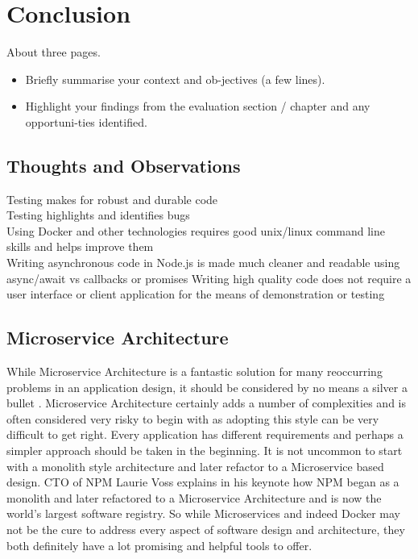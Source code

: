 \chapter{Conclusion}
About three pages.

\begin{itemize}
\item Briefly summarise your context and ob-jectives (a few lines).
\item Highlight your findings from the evaluation section / chapter and any opportuni-ties identified.
\end{itemize}

\section{Thoughts and Observations}
Testing makes for robust and durable code \\
Testing highlights and identifies bugs \\
Using Docker and other technologies requires good unix/linux command line skills and helps improve them \\
Writing asynchronous code in Node.js is made much cleaner and readable using async/await vs callbacks or promises
Writing high quality code does not require a user interface or client application for the means of demonstration or testing


\section{Microservice Architecture}
While Microservice Architecture is a fantastic solution for many reoccurring problems in an application design, it should be considered by no means a silver a bullet \cite{BuildingMicroServices}. Microservice Architecture certainly adds a number of complexities and is often considered very risky to begin with as adopting this style can be very difficult to get right. Every application has different requirements and perhaps a simpler approach should be taken in the beginning. It is not uncommon to start with a monolith style architecture and later refactor to a Microservice based design. CTO of NPM Laurie Voss explains in his keynote how NPM began as a monolith and later refactored to a Microservice Architecture and is now the world's largest software registry\cite{npm}. So while Microservices and indeed Docker may not be the cure to address every aspect of software design and architecture, they both definitely have a lot promising and helpful tools to offer.

